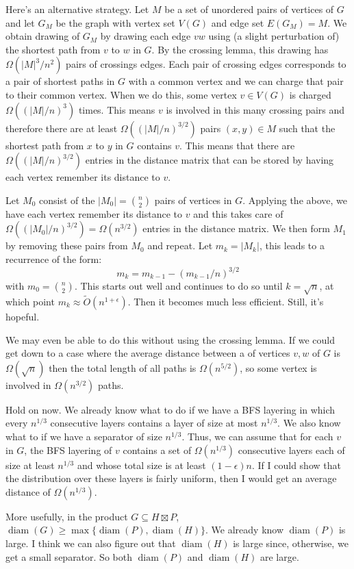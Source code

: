 \documentclass{patmorin}
\DeclareMathOperator{\diam}{diam}
\begin{document}
Here's an alternative strategy.  Let $M$ be a set of unordered pairs of vertices of $G$ and let $G_M$ be the graph with vertex set $V(G)$ and edge set $E(G_M)=M$.  We obtain drawing of $G_M$ by drawing each edge $vw$ using (a slight perturbation of) the shortest path from $v$ to $w$ in $G$.  By the crossing lemma, this drawing has $\Omega(|M|^3/n^2)$ pairs of crossings edges.  Each pair of crossing edges corresponds to a pair of shortest paths in $G$ with a common vertex and we can charge that pair to their common vertex.  When we do this, some vertex $v\in V(G)$ is charged $\Omega((|M|/n)^3)$ times.  This means $v$ is involved in this many crossing pairs and therefore there are at least $\Omega((|M|/n)^{3/2})$ pairs $(x,y)\in M$ such that the shortest path from $x$ to $y$ in $G$ contains $v$.  This means that there are $\Omega((|M|/n)^{3/2})$ entries in the distance matrix that can be stored by having each vertex remember its distance to $v$.

Let $M_0$ consist of the $|M_0|=\binom{n}{2}$ pairs of vertices in $G$.  Applying the above, we have each vertex remember its distance to $v$ and this takes care of $\Omega((|M_0|/n)^{3/2})=\Omega(n^{3/2})$ entries in the distance matrix.  We then form $M_1$ by removing these pairs from $M_0$ and repeat.  Let $m_k=|M_k|$, this leads to a recurrence of the form:
\[  m_k = m_{k-1} - (m_{k-1}/n)^{3/2} \]
with $m_0=\binom{n}{2}$.  This starts out well and continues to do so until $k=\sqrt{n}$, at which point $m_k\approx \tilde{O}(n^{1+\epsilon})$.  Then it becomes much less efficient.  Still, it's hopeful.

We may even be able to do this without using the crossing lemma.  If we could get down to a case where the average distance between a of vertices $v,w$ of $G$ is $\Omega(\sqrt{n})$ then the total length of all paths is $\Omega(n^{5/2})$, so some vertex is involved in $\Omega(n^{3/2})$ paths.

Hold on now.  We already know what to do if we have a BFS layering in which every $n^{1/3}$ consecutive layers contains a layer of size at most $n^{1/3}$. We also know what to if we have a separator of size $n^{1/3}$.  Thus, we can assume that for each $v$ in $G$, the BFS layering of $v$ contains a set of $\Omega(n^{1/3})$ consecutive layers each of size at least $n^{1/3}$ and whose total size is at least $(1-\epsilon)n$.  If I could show that the distribution over these layers is fairly uniform, then I would get an average distance of $\Omega(n^{1/3})$.

More usefully, in the product $G\subseteq H\boxtimes P$, $\diam(G)\ge\max\{\diam(P),\diam(H)\}$.  We already know $\diam(P)$ is large.  I think we can also figure out that $\diam(H)$ is large since, otherwise, we get a small separator.  So both $\diam(P)$ and $\diam(H)$ are large.
\end{document}
